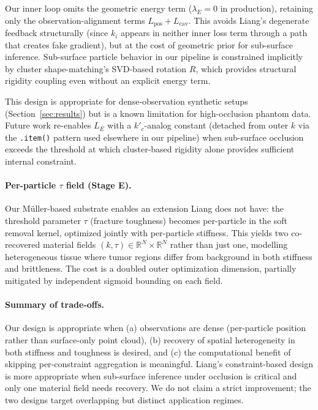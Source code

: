Our inner loop omits the geometric energy term ($\lambda_E = 0$ in
production), retaining only the observation-alignment terms
$L_\text{pos} + L_\text{cav}$. This avoids Liang's degenerate feedback
structurally (since $k_i$ appears in neither inner loss term through a
path that creates fake gradient), but at the cost of geometric prior
for sub-surface inference. Sub-surface particle behavior in our pipeline
is constrained implicitly by cluster shape-matching's SVD-based rotation
$R$, which provides structural rigidity coupling even without an explicit
energy term.

This design is appropriate for dense-observation synthetic setups
(Section~\ref{sec:results}) but is a known limitation for high-occlusion
phantom data. Future work re-enables $L_E$ with a $k'_c$-analog constant
(detached from outer $k$ via the \texttt{.item()} pattern used elsewhere
in our pipeline) when sub-surface occlusion exceeds the threshold at
which cluster-based rigidity alone provides sufficient internal constraint.

\paragraph{Per-particle $\tau$ field (Stage E).}
Our M\"uller-based substrate enables an extension Liang does not have:
the threshold parameter $\tau$ (fracture toughness) becomes per-particle
in the soft removal kernel, optimized jointly with per-particle stiffness.
This yields two co-recovered material fields $(k, \tau) \in
\mathbb{R}^N \times \mathbb{R}^N$ rather than just one, modelling
heterogeneous tissue where tumor regions differ from background in both
stiffness and brittleness. The cost is a doubled outer optimization
dimension, partially mitigated by independent sigmoid bounding on each
field.

\paragraph{Summary of trade-offs.}
Our design is appropriate when (a) observations are dense (per-particle
position rather than surface-only point cloud), (b) recovery of
spatial heterogeneity in both stiffness and toughness is desired, and
(c) the computational benefit of skipping per-constraint aggregation
is meaningful. Liang's constraint-based design is more appropriate when
sub-surface inference under occlusion is critical and only one
material field needs recovery. We do not claim a strict improvement;
the two designs target overlapping but distinct application regimes.

